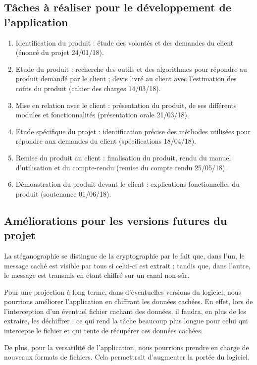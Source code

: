 \documentclass[11pt]{article}
\begin{document}
\subsection{Tâches à réaliser pour le développement de l'application}

\begin {enumerate}
\item Identification du produit : étude des volontés et des demandes du client
    (énoncé du projet 24/01/18).
\item Etude du produit : recherche des outils et des algorithmes pour répondre
    au produit demandé par le client ; devis livré au client avec l'estimation
    des coûts du produit (cahier des charges 14/03/18).
\item Mise en relation avec le client : présentation du produit, de ses
    différents modules et fonctionnalités (présentation orale 21/03/18).
\item Etude spécifique du projet : identification précise des méthodes utilisées
    pour répondre aux demandes du client (spécifications 18/04/18).
\item Remise du produit au client : finalisation du produit, rendu du manuel
    d'utilisation et du compte-rendu (remise du compte rendu 25/05/18).
\item Démonstration du produit devant le client : explications fonctionnelles du
    produit (soutenance 01/06/18).
\end{enumerate}

\subsection{Améliorations pour les versions futures du projet}

La stéganographie se distingue de la cryptographie par le fait que, dans l'un,
le message caché est visible par tous si celui-ci est extrait ; tandis que, dans
l'autre, le message est transmis en étant chiffré sur un canal non-sûr. 

Pour une projection à long terme, dans d'éventuelles versions du logiciel, nous
pourrions améliorer l'application en chiffrant les données cachées. En effet,
lors de l'interception d'un éventuel fichier cachant des données, il faudra, en
plus de les extraire, les déchiffrer : ce qui rend la tâche beaucoup plus longue
pour celui qui intercepte le fichier et qui tente de récupérer ces données
cachées. 

De plus, pour la versatilité de l'application, nous pourrions prendre en charge
de nouveaux formats de fichiers. Cela permettrait d'augmenter la portée du
logiciel. 
\end{document}
